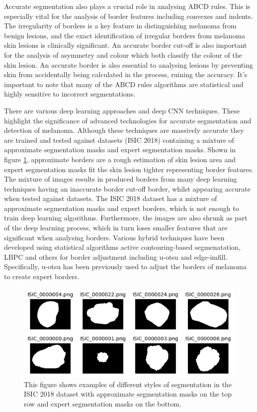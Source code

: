 Accurate segmentation also plays a crucial role in analysing ABCD rules\cite{Lee2020}. This is especially vital for the analysis of border features\cite{Pereira2020, Kaya2016} including convexes and indents. The irregularity of borders is a key feature in distinguishing melanoma from benign lesions, and the exact identification of irregular borders from melanoma skin lesions is clinically significant\cite{patil2021}. An accurate border cut-off is also important for the analysis of asymmetry and colour which both classify the colour of the skin lesion. An accurate border is also essential to analysing lesions by preventing skin from accidentally being calculated in the process, ruining the accuracy. It's important to note that many of the ABCD rules algorithms are statistical and highly sensitive to incorrect segmentations.

There are various deep learning approaches\cite{Albahli2020} and deep CNN techniques\cite{yu2017}. These highlight the significance of advanced technologies for accurate segmentation and detection of melanoma. Although these techniques are massively accurate they are trained and tested against datasets (ISIC 2018) containing a mixture of approximate segmentation masks and expert segmentation masks. Shown in figure \ref{seg-expert}, approximate borders are a rough estimation of skin lesion area and expert segmentation masks fit the skin lesion tighter representing border features. The mixture of images results in produced borders from many deep learning techniques having an inaccurate border cut-off border, whilst appearing accurate when tested against datasets. The ISIC 2018 dataset has a mixture of approximate segmentation masks and expert borders, which is not enough to train deep learning algorithms. Furthermore, the images are also shrunk as part of the deep learning process, which in turn loses smaller features that are significant when analysing borders. Various hybrid techniques have been developed using statistical algorithms active contouring-based segmenatation\cite{Riaz2019}, LBPC and others for border adjustment including u-otsu and edge-imfill. Specifically, u-otsu has been previously used to adjust the borders of melanoma to create expert borders\cite{}.

\begin{figure}[]
    \centering
    \includegraphics[scale=1.2]{images/segmentation/seg-expert-approx.png}
    \caption{This figure shows examples of different styles of segmentation in the ISIC 2018 dataset with approximate segmentation masks on the top row and expert segmentation masks on the bottom.}\label{seg-expert}
\end{figure}

